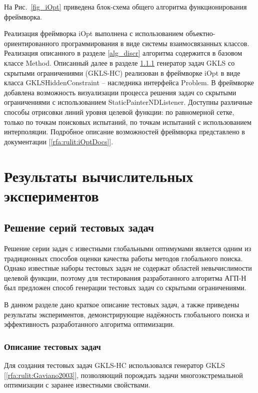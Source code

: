 \documentclass[a4paper,12pt,russian]{article}
\begin{document}
На Рис.~\ref{fig_iOpt} приведена блок-схема общего алгоритма функционирования фреймворка.



Реализация фреймворка iOpt выполнена с использованием объектно-ориентированного программирования в виде системы взаимосвязанных классов. Реализация описанного в разделе \ref{alg_discr} алгоритма содержится в базовом классе Method. Описанный далее в разделе \ref{GKLS_HC} генератор задач GKLS со скрытыми ограничениями (GKLS-HC) реализован в фреймворке iOpt в виде класса GKLSHiddenConstraint -- наследника интерфейса Problem. В фреймворке добавлена возможность визуализации процесса решения задач со скрытыми ограничениями с использованием StaticPainterNDListener. Доступны различные способы отрисовки линий уровня целевой функции: по равномерной сетке, только по точкам поисковых испытаний, по точкам испытаний с использованием интерполяции. Подробное описание возможностей фреймворка представлено в документации [\ref{rfa:rulit:iOptDocs}].

\section{Результаты вычислительных экспериментов}

\subsection{Решение серий тестовых задач} \label{GKLS_HC}

Решение серии задач с известными глобальными оптимумами является одним из традиционных способов оценки качества работы методов глобального поиска. 
Однако известные наборы тестовых задач не содержат областей невычислимости целевой функции, поэтому для тестирования разработанного алгоритма АГП-Н был предложен способ генерации тестовых задач со скрытыми ограничениями.

В данном разделе дано краткое описание тестовых задач, а также приведены результаты экспериментов, демонстрирующие надёжность глобального поиска и эффективность разработанного алгоритма оптимизации.

\subsubsection{Описание тестовых задач} \label{GKLS_HC}
 
Для создания тестовых задач GKLS-HC использовался генератор GKLS [\ref{rfa:rulit:Gaviano2003}], позволяющий порождать задачи многоэкстремальной оптимизации с заранее известными свойствами. 
\end{document}
